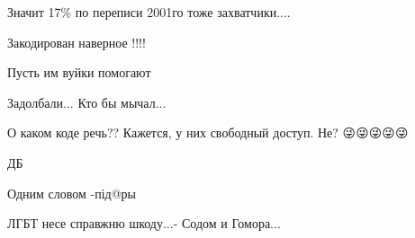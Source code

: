 \begin{itemize}
Значит 17\% по переписи 2001го тоже захватчики....

 
Закодирован наверное !!!!

 
Пусть им вуйки помогают

 
Задолбали... Кто бы мычал...

 
О каком коде речь?? Кажется, у них свободный доступ. Не? 😜😜😜😜😜

 
ДБ

 
Одним словом -під@ры

 
ЛГБТ несе справжню шкоду...- Содом и Гомора...


\end{itemize}
